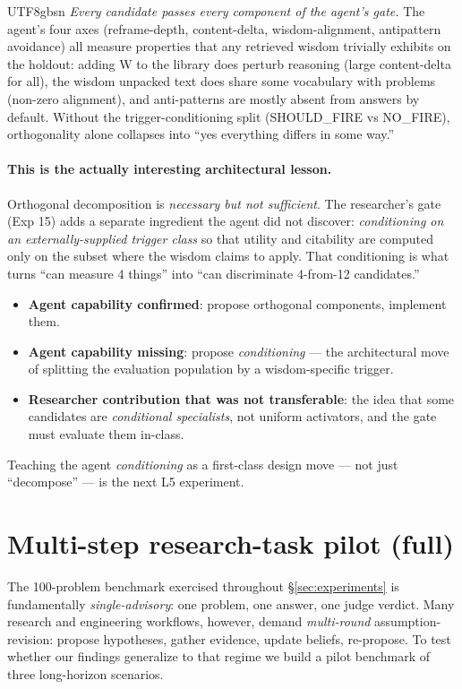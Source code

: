 \documentclass{article}
\begin{document}
\begin{CJK*}{UTF8}{gbsn}
\emph{Every candidate passes every component of the agent's
gate.} The agent's four axes
(reframe-depth, content-delta, wisdom-alignment, antipattern
avoidance) all measure properties that any retrieved wisdom
trivially exhibits on the holdout: adding W to the library does
perturb reasoning (large content-delta for all), the wisdom
unpacked text does share some vocabulary with problems (non-zero
alignment), and anti-patterns are mostly absent from answers by
default. Without the trigger-conditioning split
(SHOULD\_FIRE vs NO\_FIRE), orthogonality alone collapses into
``yes everything differs in some way.''

\paragraph{This is the actually interesting architectural
lesson.} Orthogonal decomposition is \emph{necessary but not
sufficient}. The researcher's gate (Exp 15) adds a separate
ingredient the agent did not discover: \emph{conditioning on an
externally-supplied trigger class} so that utility and
citability are computed only on the subset where the wisdom
claims to apply. That conditioning is what turns ``can measure
4 things'' into ``can discriminate 4-from-12 candidates.''
\begin{itemize}[leftmargin=*,topsep=2pt,itemsep=1pt]
  \item \textbf{Agent capability confirmed}: propose
    orthogonal components, implement them.
  \item \textbf{Agent capability missing}: propose
    \emph{conditioning} — the architectural move of splitting
    the evaluation population by a wisdom-specific trigger.
  \item \textbf{Researcher contribution that was not
    transferable}: the idea that some candidates are
    \emph{conditional specialists}, not uniform activators,
    and the gate must evaluate them in-class.
\end{itemize}
Teaching the agent \emph{conditioning} as a first-class design
move — not just ``decompose'' — is the next L5 experiment.




\section{Multi-step research-task pilot (full)}
\label{app:multistep}

The 100-problem benchmark exercised throughout \S\ref{sec:experiments}
is fundamentally \emph{single-advisory}: one problem, one answer,
one judge verdict. Many research and engineering workflows, however,
demand \emph{multi-round} assumption-revision: propose hypotheses,
gather evidence, update beliefs, re-propose. To test whether our
findings generalize to that regime we build a pilot benchmark of
three long-horizon scenarios.


\end{CJK*}
\end{document}
